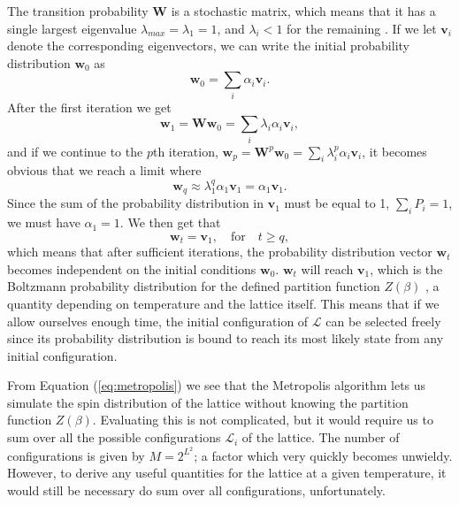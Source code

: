 \documentclass[]{article}
\begin{document}
The transition probability $\mathbf{W}$ is a stochastic matrix, which means that it has a single largest eigenvalue $\lambda_{max} = \lambda_1 = 1$, and $\lambda_i < 1$ for the remaining \cite{fys4150-notes}. If we let $\mathbf{v}_i$ denote the corresponding eigenvectors, we can write the initial probability distribution $\mathbf{w}_{0}$ as
\begin{equation}
	\mathbf{w}_{0} = \sum_{i} \alpha_i \mathbf{v}_i.
\end{equation}
After the first iteration we get
\begin{equation}
	\mathbf{w}_{1} = \mathbf{W} \mathbf{w}_{0} = \sum_{i} \lambda_i \alpha_i \mathbf{v}_i,
\end{equation}
and if we continue to the $p$th iteration, $\mathbf{w}_{p} = \mathbf{W}^p \mathbf{w}_{0} = \sum_{i} \lambda_i^p \alpha_i \mathbf{v}_i$, it becomes obvious that we reach a limit where
\begin{equation}
	\mathbf{w}_{q} \approx \lambda_1^q \alpha_1 \mathbf{v}_1 = \alpha_1 \mathbf{v}_1.
\end{equation}
Since the sum of the probability distribution in $\mathbf{v}_1$ must be equal to 1, $\sum_{i} P_i = 1$, we must have $\alpha_1 = 1$. We then get that
\begin{equation} \label{eq:steady-state}
	\mathbf{w}_{t} = \mathbf{v}_1, \quad \text{for} \quad t \ge q,
\end{equation}
which means that after sufficient iterations, the probability distribution vector $\mathbf{w}_{t}$ becomes independent on the initial conditions $\mathbf{w}_{0}$. $\mathbf{w}_{t}$ will reach $\mathbf{v}_1$, which is the Boltzmann probability distribution for the defined partition function $Z(\beta)$ \cite{newman1999monte}, a quantity depending on temperature and the lattice itself. This means that if we allow ourselves enough time, the initial configuration of $\mathcal{L}$ can be selected freely since its probability distribution is bound to reach its most likely state from any initial configuration.

\vspace{5mm}

From Equation (\ref{eq:metropolis}) we see that the Metropolis algorithm lets us simulate the spin distribution of the lattice without knowing the partition function $Z(\beta)$. Evaluating this is not complicated, but it would require us to sum over all the possible configurations $\mathcal{L}_i$ of the lattice. The number of configurations is given by $M = 2^{L^2}$; a factor which very quickly becomes unwieldy. However, to derive any useful quantities for the lattice at a given temperature, it would still be necessary do sum over all configurations, unfortunately.
\end{document}
